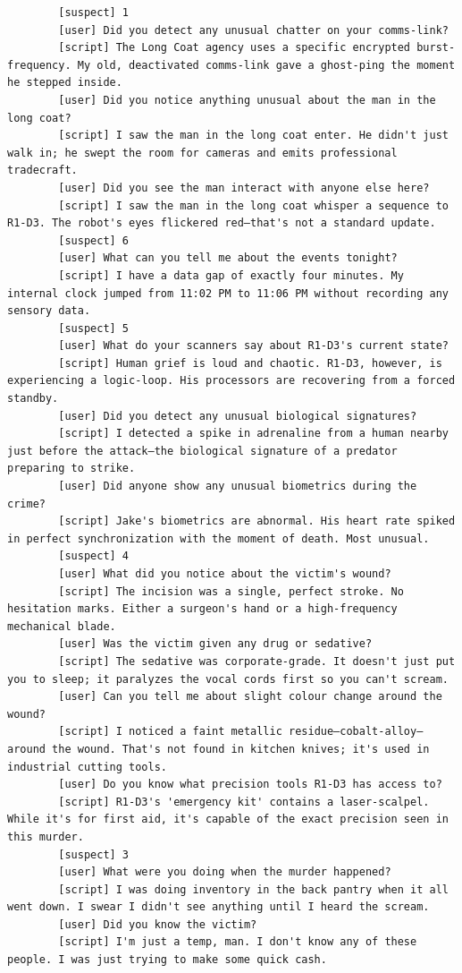 \documentclass[12pt, a4paper]{report}
\begin{document}
	\begin{verbatim}
		[suspect] 1
		[user] Did you detect any unusual chatter on your comms-link?
		[script] The Long Coat agency uses a specific encrypted burst-frequency. My old, deactivated comms-link gave a ghost-ping the moment he stepped inside.
		[user] Did you notice anything unusual about the man in the long coat?
		[script] I saw the man in the long coat enter. He didn't just walk in; he swept the room for cameras and emits professional tradecraft.
		[user] Did you see the man interact with anyone else here?
		[script] I saw the man in the long coat whisper a sequence to R1-D3. The robot's eyes flickered red—that's not a standard update.
		[suspect] 6
		[user] What can you tell me about the events tonight?
		[script] I have a data gap of exactly four minutes. My internal clock jumped from 11:02 PM to 11:06 PM without recording any sensory data.
		[suspect] 5
		[user] What do your scanners say about R1-D3's current state?
		[script] Human grief is loud and chaotic. R1-D3, however, is experiencing a logic-loop. His processors are recovering from a forced standby.
		[user] Did you detect any unusual biological signatures?
		[script] I detected a spike in adrenaline from a human nearby just before the attack—the biological signature of a predator preparing to strike.
		[user] Did anyone show any unusual biometrics during the crime?
		[script] Jake's biometrics are abnormal. His heart rate spiked in perfect synchronization with the moment of death. Most unusual.
		[suspect] 4
		[user] What did you notice about the victim's wound?
		[script] The incision was a single, perfect stroke. No hesitation marks. Either a surgeon's hand or a high-frequency mechanical blade.
		[user] Was the victim given any drug or sedative?
		[script] The sedative was corporate-grade. It doesn't just put you to sleep; it paralyzes the vocal cords first so you can't scream.
		[user] Can you tell me about slight colour change around the wound?
		[script] I noticed a faint metallic residue—cobalt-alloy—around the wound. That's not found in kitchen knives; it's used in industrial cutting tools.
		[user] Do you know what precision tools R1-D3 has access to?
		[script] R1-D3's 'emergency kit' contains a laser-scalpel. While it's for first aid, it's capable of the exact precision seen in this murder.
		[suspect] 3
		[user] What were you doing when the murder happened?
		[script] I was doing inventory in the back pantry when it all went down. I swear I didn't see anything until I heard the scream.
		[user] Did you know the victim?
		[script] I'm just a temp, man. I don't know any of these people. I was just trying to make some quick cash.

\end{verbatim}
\end{document}
